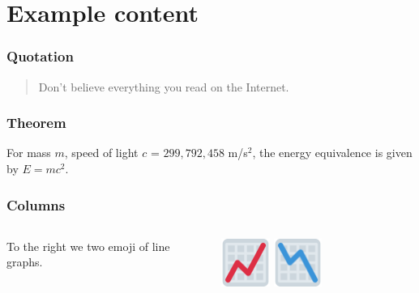 

\section{Example content}


\begin{frame}
  \frametitle{Quotation}

  \begin{quotation}
    Don't believe everything you read on the Internet. \\
  \end{quotation}
\end{frame}


\begin{frame}
\frametitle{Theorem}
\begin{theorem}
  For mass $m$, speed of light $c$ = $299,792,458$ m/s$^2$, the energy
  equivalence is given by $E = mc^2.$
\end{theorem}
\end{frame}


\begin{frame}
  \frametitle{Columns}
  \begin{columns}
\begin{column}{0.5\textwidth}
   To the right we two emoji of line graphs.
\end{column}
\begin{column}{0.5\textwidth}  %
    \begin{center}
      \includegraphics[width=0.25\textwidth]{fig/emoji-graph-upwards.png} \;\;
      \includegraphics[width=0.25\textwidth]{fig/emoji-graph-downwards.png} 
     \end{center}
\end{column}
\end{columns}
\end{frame}


